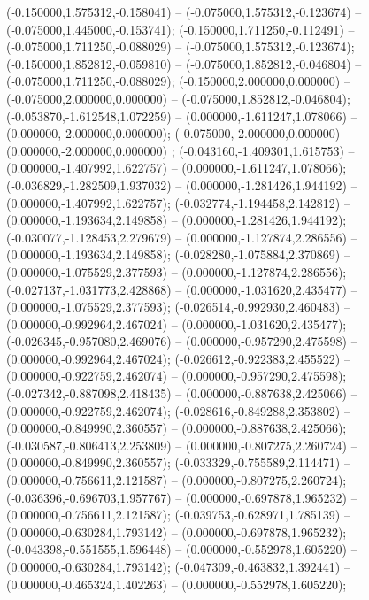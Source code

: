  (-0.150000,1.575312,-0.158041) -- (-0.075000,1.575312,-0.123674) -- (-0.075000,1.445000,-0.153741);
 (-0.150000,1.711250,-0.112491) -- (-0.075000,1.711250,-0.088029) -- (-0.075000,1.575312,-0.123674);
 (-0.150000,1.852812,-0.059810) -- (-0.075000,1.852812,-0.046804) -- (-0.075000,1.711250,-0.088029);
 (-0.150000,2.000000,0.000000) -- (-0.075000,2.000000,0.000000) -- (-0.075000,1.852812,-0.046804);
 (-0.053870,-1.612548,1.072259) -- (0.000000,-1.611247,1.078066) -- (0.000000,-2.000000,0.000000);
 (-0.075000,-2.000000,0.000000) -- (0.000000,-2.000000,0.000000) ;
 (-0.043160,-1.409301,1.615753) -- (0.000000,-1.407992,1.622757) -- (0.000000,-1.611247,1.078066);
 (-0.036829,-1.282509,1.937032) -- (0.000000,-1.281426,1.944192) -- (0.000000,-1.407992,1.622757);
 (-0.032774,-1.194458,2.142812) -- (0.000000,-1.193634,2.149858) -- (0.000000,-1.281426,1.944192);
 (-0.030077,-1.128453,2.279679) -- (0.000000,-1.127874,2.286556) -- (0.000000,-1.193634,2.149858);
 (-0.028280,-1.075884,2.370869) -- (0.000000,-1.075529,2.377593) -- (0.000000,-1.127874,2.286556);
 (-0.027137,-1.031773,2.428868) -- (0.000000,-1.031620,2.435477) -- (0.000000,-1.075529,2.377593);
 (-0.026514,-0.992930,2.460483) -- (0.000000,-0.992964,2.467024) -- (0.000000,-1.031620,2.435477);
 (-0.026345,-0.957080,2.469076) -- (0.000000,-0.957290,2.475598) -- (0.000000,-0.992964,2.467024);
 (-0.026612,-0.922383,2.455522) -- (0.000000,-0.922759,2.462074) -- (0.000000,-0.957290,2.475598);
 (-0.027342,-0.887098,2.418435) -- (0.000000,-0.887638,2.425066) -- (0.000000,-0.922759,2.462074);
 (-0.028616,-0.849288,2.353802) -- (0.000000,-0.849990,2.360557) -- (0.000000,-0.887638,2.425066);
 (-0.030587,-0.806413,2.253809) -- (0.000000,-0.807275,2.260724) -- (0.000000,-0.849990,2.360557);
 (-0.033329,-0.755589,2.114471) -- (0.000000,-0.756611,2.121587) -- (0.000000,-0.807275,2.260724);
 (-0.036396,-0.696703,1.957767) -- (0.000000,-0.697878,1.965232) -- (0.000000,-0.756611,2.121587);
 (-0.039753,-0.628971,1.785139) -- (0.000000,-0.630284,1.793142) -- (0.000000,-0.697878,1.965232);
 (-0.043398,-0.551555,1.596448) -- (0.000000,-0.552978,1.605220) -- (0.000000,-0.630284,1.793142);
 (-0.047309,-0.463832,1.392441) -- (0.000000,-0.465324,1.402263) -- (0.000000,-0.552978,1.605220);
